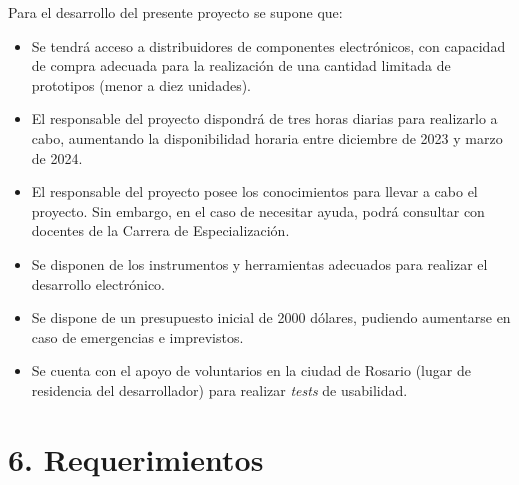 \documentclass[
11pt, %
]{charter}
\begin{document}
Para el desarrollo del presente proyecto se supone que:

\begin{itemize}
	\item Se tendrá acceso a distribuidores de componentes electrónicos, con capacidad de compra adecuada para la realización de una cantidad limitada de prototipos (menor a diez unidades).
	\item El responsable del proyecto dispondrá de tres horas diarias para realizarlo a cabo, aumentando la disponibilidad horaria entre diciembre de 2023 y marzo de 2024.
	\item El responsable del proyecto posee los conocimientos para llevar a cabo el proyecto. Sin embargo, en el caso de necesitar ayuda, podrá consultar con docentes de la Carrera de Especialización. 
	\item Se disponen de los instrumentos y herramientas adecuados para realizar el desarrollo electrónico.
	\item Se dispone de un presupuesto inicial de 2000 dólares, pudiendo aumentarse en caso de emergencias e imprevistos.
	\item Se cuenta con el apoyo de voluntarios en la ciudad de Rosario (lugar de residencia del desarrollador) para realizar \emph{tests} de usabilidad.
\end{itemize}

\section{6. Requerimientos}
\label{sec:requerimientos}
\end{document}
